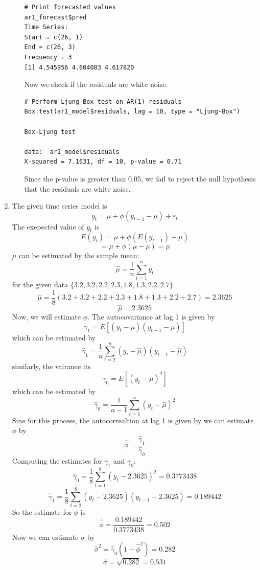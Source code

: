 \documentclass[12pt]{article}
\begin{document}
\begin{enumerate}
\begin{enumerate}
\begin{verbatim}
# Print forecasted values
ar1_forecast$pred
Time Series:
Start = c(26, 1) 
End = c(26, 3) 
Frequency = 3 
[1] 4.545956 4.604083 4.617820
\end{verbatim} 
    Now we check if the residuals are white noise.
\begin{verbatim}
# Perform Ljung-Box test on AR(1) residuals
Box.test(ar1_model$residuals, lag = 10, type = "Ljung-Box")

Box-Ljung test

data:  ar1_model$residuals
X-squared = 7.1631, df = 10, p-value = 0.71
\end{verbatim}
    Since the p-value is greater than 0.05, 
    we fail to reject the null hypothesis that the 
    residuals are white noise.
    \end{enumerate}
    \item The given time series model is
    \[
        y_t = \mu + \phi(y_{t-1} - \mu) + \varepsilon_t
    \]
    The exepected value of $y_t$ is
    \[
        E(y_t) = \mu + \phi(E(y_{t-1}) - \mu)
    \]
    \[
       = \mu + \phi(\mu - \mu) = \mu
    \]
    $\mu$ can be estimated by the sample mean:
    \[
        \hat{\mu} = \frac{1}{n} \sum_{t=1}^{n} y_t
    \]
    for the given data $\{3.2,3.2,2.2,2.3,1.8,1.3,2.2,2.7\}$
    \[
        \hat{\mu} = \frac{1}{8} (3.2 + 3.2 + 2.2 + 2.3 + 1.8 + 1.3 + 2.2 + 2.7) = 2.3625
    \]
    \[
        \hat{\mu} = 2.3625
    \]
    Now, we will estimate $\phi$.
    The autocovariance at lag 1 is given by
    \[
        \gamma_1 = E[(y_t - \mu)(y_{t-1} - \mu)]
    \]
    which can be estimated by
    \[
        \hat{\gamma}_1 = \frac{1}{n} \sum_{t=2}^{n} (y_t - \hat{\mu})(y_{t-1} - \hat{\mu})
    \]
    similarly, the vairance its
    \[
        \gamma_0 = E[(y_t - \mu)^2]
    \]
    which can be estimated by
    \[
        \hat{\gamma}_0 = \frac{1}{n-1} \sum_{t=1}^{n} (y_t - \hat{\mu})^2
    \]
    Sine for this process, the autocorrealtion at lag 1 is given by
    we can estimate $\phi$ by
    \[
        \hat{\phi} = \frac{\hat{\gamma}_1}{\hat{\gamma}_0}
    \]
    Computing the estimates for $\gamma_1$ and $\gamma_0$:
    \[ 
    \hat{\gamma}_0 = \frac{1}{8} 
    \sum_{t=1}^{8} (y_t - 2.3625)^2 = 0.3773438
    \]
    \[
    \hat{\gamma}_1 = \frac{1}{8}
    \sum_{t=2}^{8} (y_t - 2.3625)(y_{t-1} - 2.3625) = 0.189442
    \]
    So the estimate for $\phi$ is
    \[
        \hat{\phi} = \frac{0.189442}{0.3773438} = 0.502
    \]
    Now we can estimate $\sigma$ by
    \[
        \hat{\sigma}^2 = \hat{\gamma}_0(1 - \hat{\phi}^2) = 0.282
    \]
    \[    
        \hat{\sigma} = \sqrt{0.282} = 0.531
    \]


\end{enumerate}
\end{document}
